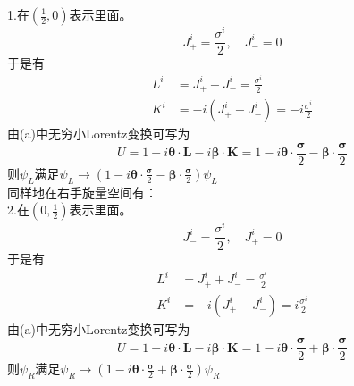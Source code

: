 \documentclass{article}
\begin{document}
1.在$(\frac{1}{2},0)$表示里面。$$J_{+}^{i}=\frac{\sigma^{i}}{2}, \quad J_{-}^{i} = 0 $$
于是有
\begin{align}
 L^{i} &= J_{+}^{i} + J_{-}^{i} = \frac{\sigma^{i}}{2} \nonumber \\
 K^{i} &= -i(J_{+}^{i} - J_{-}^{i}) = -i \frac{\sigma^{i}}{2} \nonumber 
\end{align}
由(a)中无穷小Lorentz变换可写为
$$U = 1- i \boldsymbol{\theta} \cdot \mathbf{L} -i\boldsymbol{\beta} \cdot \mathbf{K}
=1- i \boldsymbol{\theta} \cdot \frac{\boldsymbol{\sigma}}{2} -\boldsymbol{\beta} \cdot \frac{\boldsymbol{\sigma}}{2}$$
则$\psi_{L}$满足$\psi_{L} \rightarrow (1- i \boldsymbol{\theta} \cdot \frac{\boldsymbol{\sigma}}{2} -\boldsymbol{\beta} \cdot \frac{\boldsymbol{\sigma}}{2})\psi_{L}$
\\同样地在右手旋量空间有：\\
2.在$(0,\frac{1}{2})$表示里面。$$J_{-}^{i}=\frac{\sigma^{i}}{2}, \quad J_{+}^{i} = 0 $$
于是有
\begin{align}
 L^{i} &= J_{+}^{i} + J_{-}^{i} = \frac{\sigma^{i}}{2} \nonumber \\
 K^{i} &= -i(J_{+}^{i} - J_{-}^{i}) = i \frac{\sigma^{i}}{2} \nonumber 
\end{align}
由(a)中无穷小Lorentz变换可写为
$$U = 1- i \boldsymbol{\theta} \cdot \mathbf{L} - i\boldsymbol{\beta}  \cdot \mathbf{K}
=1- i \boldsymbol{\theta} \cdot \frac{\boldsymbol{\sigma}}{2} +\boldsymbol{\beta} \cdot \frac{\boldsymbol{\sigma}}{2}$$
则$\psi_{R}$满足$\psi_{R} \rightarrow (1- i \boldsymbol{\theta} \cdot \frac{\boldsymbol{\sigma}}{2} +\boldsymbol{\beta} \cdot \frac{\boldsymbol{\sigma}}{2})\psi_{R}$
\end{document}
